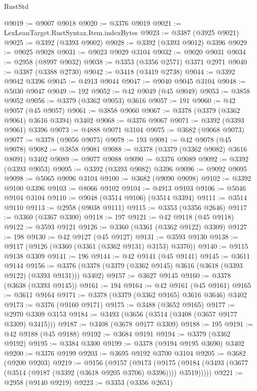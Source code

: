 \begin{lexlean}{RustStd}
\begin{coremodule}
@9019 := @9007 @9018
@9020 := @3376 @9019
@9021 := LexLeanTarget.RustSyntax.Item.indexBytes
@9023 := @3387 (@3925 @9021)
@9025 := @3392 (@3393 @9002)
@9028 := @3392 (@3393 @9012) @3396
@9029 := @9025 @9028
@9031 := @9023 @9029 @3104
@9032 := @9020 @9031
@9034 := @2958 (@8997 @9032)
@9038 := @3353 (@3356 @2571) @3371 @2971
@9040 := @3387 (@3388 @2730)
@9042 := @3418 (@3419 @2738)
@9044 := @3392 @9042 @3396
@9045 := @4913 @9044
@9047 := @9040 @9045 @3104
@9048 := @5030 @9047
@9049 := 192
@9052 := @42 @9049 (@45 @9049)
@9053 := @3858 @9052
@9056 := @3379 (@3362 @9053) @3616
@9057 := 191
@9060 := @42 @9057 (@45 @9057)
@9061 := @3858 @9060
@9067 := @3378 (@3379 (@3362 @9061) @3616 @3394) @3402
@9068 := @3376 @9067
@9071 := @3392 (@3393 @9061) @3396
@9073 := @4888 @9071 @3104
@9075 := @3682 (@9068 @9073)
@9077 := @3378 (@9056 @9075)
@9078 := 193
@9081 := @42 @9078 (@45 @9078)
@9082 := @3858 @9081
@9088 := @3378 (@3379 (@3362 @9082) @3616 @8091) @3402
@9089 := @9077 @9088
@9090 := @3376 @9089
@9092 := @3392 (@3393 @9053)
@9095 := @3392 (@3393 @9082) @3396
@9096 := @9092 @9095
@9098 := @5065 @9096 @3104
@9100 := @3682 (@9090 @9098)
@9102 := @3392 @9100 @3396
@9103 := @8066 @9102
@9104 := @4913 @9103
@9106 := @5046 @9104 @3104
@9110 := @9048 (@3514 @9106) (@3514 @3394)
@9111 := @3514 @9110
@9113 := @2958 (@9038 @9111)
@9115 := @3353 (@3356 @2646)
@9117 := @3360 (@3367 @3300)
@9118 := 197
@9121 := @42 @9118 (@45 @9118)
@9122 := @3593 @9121
@9126 := @3360 (@3361 (@3362 @9122) @3309)
@9127 := 198
@9130 := @42 @9127 (@45 @9127)
@9131 := @3593 @9130
@9138 := @9117 (@9126 (@3360 (@3361 (@3362 @9131) @3153) @3370))
@9140 := @9115 @9138 @3309
@9141 := 196
@9144 := @42 @9141 (@45 @9141)
@9145 := @3611 @9144
@9156 := @3376 (@3378 (@3379 (@3362 @9145) @3616 (@3618 (@3393 @9122) (@3393 @9131))) @3402)
@9157 := @3627 @9145
@9160 := @3378 (@3638 (@3393 @9145))
@9161 := 194
@9164 := @42 @9161 (@45 @9161)
@9165 := @3611 @9164
@9171 := @3378 (@3379 (@3362 @9165) @3616 @3646) @3402
@9173 := @3376 (@9160 @9171)
@9175 := @3488 (@3652 @9165)
@9177 := @2970 @3309 @3153
@9184 := @3493 (@3656 (@3514 (@3408 (@3657 @9177 @3309) @3415)))
@9187 := @3408 (@3678 @9177 @3309)
@9188 := 195
@9191 := @42 @9188 (@45 @9188)
@9192 := @3684 @9191
@9194 := @3379 (@3362 @9192)
@9195 := @3384 @3300
@9199 := @3378 (@9194 @9195 @3690) @3402
@9200 := @3376 @9199
@9203 := @3695 @9192 @3700 @3104
@9205 := @3682 (@9200 @9203)
@9219 := @9156
    (@9157
      (@9173
        (@9175 (@9184 (@3493 (@3677 (@3514 (@9187 (@3392 (@3618 @9205 @3706) @3396)))) @3519)))))
@9221 := @2958 (@9140 @9219)
@9223 := @3353 (@3356 @2651)

\end{coremodule}
\end{lexlean}
